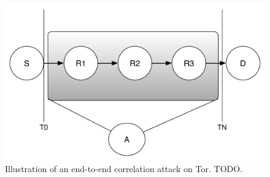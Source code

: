 \begin{figure}
\begin{center}
\includegraphics[scale=0.40]{images/tor_attack.pdf}
\caption{Illustration of an end-to-end correlation attack on Tor. TODO.}
\label{fig:tor-end-to-end}
\end{center}
\end{figure}

